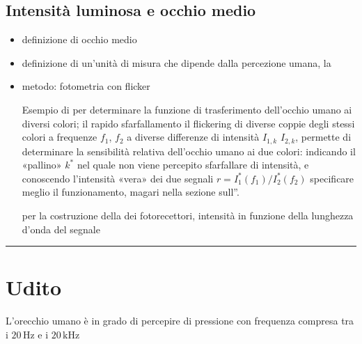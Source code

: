\documentclass[letterpaper,10pt,italian]{jupyterBook}
\begin{document}
\subsection{Intensità luminosa e occhio medio}
\label{\detokenize{ch/intro/sensing-sight:intensita-luminosa-e-occhio-medio}}\label{\detokenize{ch/intro/sensing-sight:physics-hs-intro-sensing-sight-avg-eye}}\begin{itemize}
\item {} 
\sphinxAtStartPar
definizione di occhio medio

\item {} 
\sphinxAtStartPar
definizione di un’unità di misura che dipende dalla percezione umana, la {\hyperref[\detokenize{ch/intro::doc}]{}}

\item {} 
\sphinxAtStartPar
metodo: fotometria con flicker%
\begin{footnote}[3]\sphinxAtStartFootnote
Esempio di  per determinare la funzione di trasferimento dell’occhio umano ai diversi colori; il rapido sfarfallamento \sphinxhyphen{} il flickering \sphinxhyphen{} di diverse coppie degli stessi colori a frequenze \(f_1\), \(f_2\) a diverse differenze di intensità \(I_{1,k}\) \(I_{2,k}\), permette di determinare la sensibilità relativa dell’occhio umano ai due colori: indicando il «pallino» \(k^*\) nel quale non viene percepito sfarfallare di intensità, e conoscendo l’intensità «vera» dei due segnali \(r = I^*_{1}(f_1)/ I^*_{2}(f_2)\)  specificare meglio il funzionamento, magari nella sezione sull”{\hyperref[\detokenize{ch/intro/physical_quantities-luminosity:physics-hs-intro-physical-quantities-luminosity}]{}}.
%
\end{footnote} per la costruzione della {\hyperref[\detokenize{ch/intro/measurements:physics-hs-intro-measurements-order}]{}} dei fotorecettori, intensità in funzione della lunghezza d’onda del segnale

\end{itemize}


\bigskip\hrule\bigskip


\sphinxstepscope


\section{Udito}
\label{\detokenize{ch/intro/sensing-hearing:udito}}\label{\detokenize{ch/intro/sensing-hearing:physics-hs-intro-sensing-hearing}}\label{\detokenize{ch/intro/sensing-hearing::doc}}
\sphinxAtStartPar
L’orecchio umano è in grado di percepire {\hyperref[\detokenize{ch/waves/intro:physics-hs-waves-intro}]{}} di pressione con frequenza compresa tra i \(20 \, \text{Hz}\) e i \(20 \, \text{kHz}\)
\end{document}
